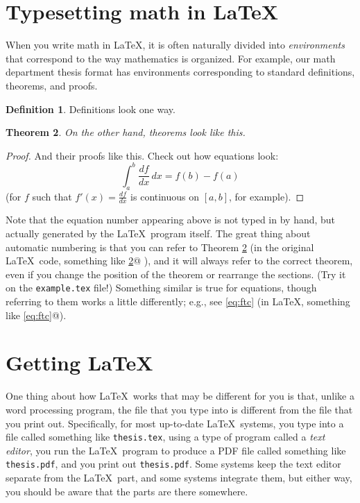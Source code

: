 \documentclass[modernstyle,12pt]{sjsuthesis}
\newtheorem{thm}{Theorem}[section]
\theoremstyle{definition}
\newtheorem{defn}[thm]{Definition}
\begin{document}
\section{Typesetting math in \LaTeX}
\label{sect:latex-math}

When you write math in \LaTeX, it is often naturally divided into {\it
  environments\/} that correspond to the way mathematics is organized.
For example, our math department thesis format has environments
corresponding to standard definitions, theorems, and proofs.

\begin{defn}
Definitions look one way.
\end{defn}

\begin{thm}\label{thm:sample}
On the other hand, theorems look like this.
\end{thm}

\begin{proof}
And their proofs like this.  Check out how equations look:
\begin{equation}\label{eq:ftc}
\int_a^b \dfrac{df}{dx} \,dx = f(b)-f(a)
\end{equation}
(for $f$ such that $f'(x)=\frac{df}{dx}$ is continuous on $[a,b]$, for
example).
\end{proof}

Note that the equation number appearing above is not typed in by hand,
but actually generated by the \LaTeX\ program itself.  The great thing
about automatic numbering is that you can refer to Theorem
\ref{thm:sample} (in the original \LaTeX\ code, something like
%
\verb@Theorem \ref{thm:sample}@%
%
), and it will always refer to the correct theorem, even if you change
the position of the theorem or rearrange the sections.  (Try it on the
{\tt example.tex\/} file!)  Something similar is true for equations,
though referring to them works a little differently; e.g., see
\eqref{eq:ftc} (in \LaTeX, something like \verb@\eqref{eq:ftc}@).



\section{Getting \LaTeX}

One thing about how \LaTeX\ works that may be different for you is
that, unlike a word processing program, the file that you type into is
different from the file that you print out.  Specifically, for most
up-to-date \LaTeX\ systems, you type into a file called something like
{\tt thesis.tex}, using a type of program called a {\it text editor},
you run the \LaTeX\ program to produce a PDF file called something
like {\tt thesis.pdf}, and you print out {\tt thesis.pdf}.  Some
systems keep the text editor separate from the \LaTeX\ part, and some
systems integrate them, but either way, you should be aware that the
parts are there somewhere.
\end{document}
